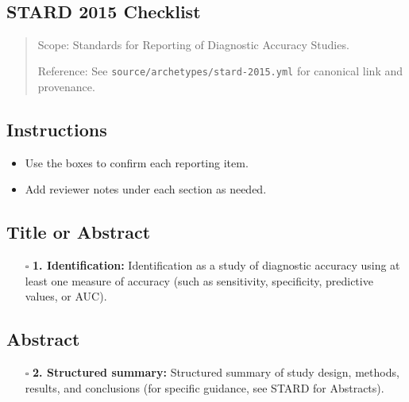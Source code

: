 \documentclass[11pt]{article}
\def\tightlist{}
\begin{document}
\begin{center}
{\LARGE }\\[4pt]
\normalsize 
\end{center}
\vspace{1em}

\begin{Form}

\section{STARD 2015 Checklist}\label{stard-2015-checklist}

\begin{quote}
Scope: Standards for Reporting of Diagnostic Accuracy Studies.

Reference: See \texttt{source/archetypes/stard-2015.yml} for canonical
link and provenance.
\end{quote}

\subsection{Instructions}\label{instructions}

\begin{itemize}
\tightlist
\item
  Use the boxes to confirm each reporting item.
\item
  Add reviewer notes under each section as needed.
\end{itemize}

\subsection{Title or Abstract}\label{title-or-abstract}

\begin{itemize}
\tightlist
\item[$\square$]
  \textbf{1. Identification:} Identification as a study of diagnostic
  accuracy using at least one measure of accuracy (such as sensitivity,
  specificity, predictive values, or AUC).
\end{itemize}

\subsection{Abstract}\label{abstract}

\begin{itemize}
\tightlist
\item[$\square$]
  \textbf{2. Structured summary:} Structured summary of study design,
  methods, results, and conclusions (for specific guidance, see STARD
  for Abstracts).
\end{itemize}


\end{Form}
\end{document}
